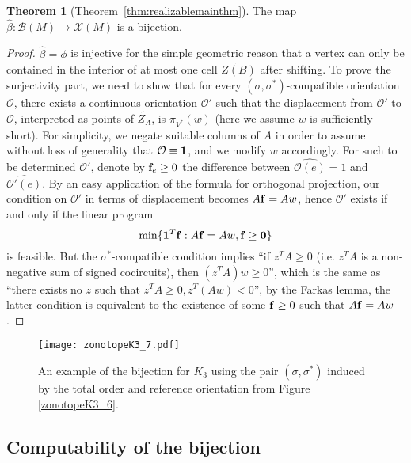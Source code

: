 \documentclass[12pt]{amsart}
\numberwithin{equation}{section}
\theoremstyle{definition}
\newtheorem{theorem}{Theorem}[subsection]
\begin{document}
\begin{theorem}[Theorem~\ref{thm:realizablemainthm}] \label{thm:betabijective}
The map $\hat{\beta} : {\mathcal B}(M) \to {\mathcal X}(M)$ is a bijection.
\end{theorem}

\begin{proof} $\hat{\beta}=\phi$ is injective for the simple geometric reason that a vertex can only be contained in the interior of at most one cell $\widetilde{Z(B)}$ after shifting. To prove the surjectivity part, we need to show that for every $(\sigma,\sigma^*)$-compatible orientation $\mathcal{O}$, there exists a continuous orientation $\mathcal{O}'$ such that the displacement from $\mathcal{O}'$ to $\mathcal{O}$, interpreted as points of $\widetilde{Z_A}$, is $\pi_{V^*}(w)$ (here we assume $w$ is sufficiently short). For simplicity, we negate suitable columns of $A$ in order to assume without loss of generality that $\mathcal{O}\equiv {\bf 1}$, and we modify $w$ accordingly. For such to be determined $\mathcal{O}'$, denote by ${\bf f}_e\geq 0$ the difference between $\widehat{\mathcal{O}(e)}=1$ and $\widehat{\mathcal{O}'(e)}$. By an easy application of the formula for orthogonal projection, our condition on $\mathcal{O}'$ in terms of displacement becomes $A{\bf f}=Aw$, hence $\mathcal{O}'$ exists if and only if the linear program
\begin{equation}\label{inverse_LP}
\min\{{\bf 1}^T{\bf f}:A{\bf f}=Aw, {\bf f}\geq {\bf 0}\}
\end{equation}
is feasible. But the $\sigma^*$-compatible condition implies ``if $z^TA\geq 0$ (i.e. $z^TA$ is a non-negative sum of signed cocircuits), then $(z^TA)w\geq 0$'', which is the same as ``there exists no $z$ such that $z^TA\geq 0, z^T(Aw)<0$'', by the Farkas lemma, the latter condition is equivalent to the existence of some ${\bf f}\geq 0$ such that $A{\bf f}=Aw$.

\end{proof}

\begin{figure}[ht!]
\begin{center}
    \texttt{[image: zonotopeK3\_7.pdf]}
\end{center}
  \caption{An example of the bijection for $K_3$ using the pair $(\sigma, \sigma^*)$ induced by the total order and reference orientation from Figure \ref{zonotopeK3_6}.}
\end{figure}

\subsection{Computability of the bijection} \label{sec:bijectioncomputable}
\end{document}
